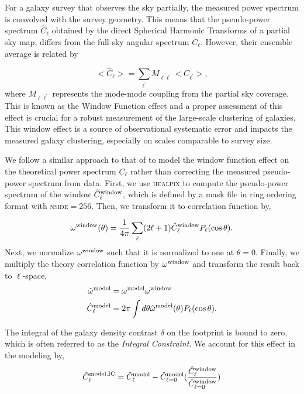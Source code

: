 For a galaxy survey that observes the sky partially, the measured power spectrum is convolved with the survey geometry. This means that the pseudo-power spectrum $\hat{C}_{\ell}$ obtained by the direct Spherical Harmonic Transforms of a partial sky map, differs from the full-sky angular spectrum $C_{\ell}$. However, their ensemble average is related by \citep{hivonmaster2002ApJ...567....2H} 

\begin{equation}
    <\hat{C}_{\ell}> = \sum_{\ell^{\prime}} M_{\ell \ell^{\prime}}<C_{\ell^{\prime}}>,
\end{equation}
where $M_{\ell \ell^{\prime}}$ represents the mode-mode coupling from the partial sky coverage. This is known as the Window Function effect and a proper assessment of this effect is crucial for a robust measurement of the large-scale clustering of galaxies. This window effect is a source of observational systematic error and impacts the measured galaxy clustering, especially on scales comparable to survey size.

We follow a similar approach to that of \citep{chon2004MNRAS.350..914C} to model the window function effect on the theoretical power spectrum $C_{\ell}$ rather than correcting the measured pseudo-power spectrum from data. First, we use \textsc{healpix} to compute the pseudo-power spectrum of the window $\hat{C}^{\rm window}_{\ell}$, which is defined by a mask file in ring ordering format with \textsc{nside}$=256$. Then, we transform it to correlation function by,

\begin{equation}
    \omega^{\rm window} (\theta) = \frac{1}{4\pi}\sum_{\ell} (2\ell+1) \hat{C}^{\rm window}_{\ell} P_{\ell}(\cos \theta).
\end{equation}
Next, we normalize $\omega^{\rm window}$ such that it is normalized to one at $\theta=0$. Finally, we multiply the theory correlation function by $\omega^{\rm window}$ and transform the result back to $\ell$-space,%
\begin{align}
    \hat{\omega}^{\rm model} &= \omega^{\rm model} \omega^{\rm window} \\
    \hat{C}^{\rm model}_{\ell} &= 2\pi \int d\theta \hat{\omega}^{\rm model}(\theta)P_{\ell}(\cos \theta).
\end{align}

The integral of the galaxy density contrast $\delta$ on the footprint is bound to zero, which is often referred to as the \textit{Integral Constraint}. We account for this effect in the modeling by,
\begin{equation}
     \hat{C}^{\rm model, IC}_{\ell} = \hat{C}^{\rm model}_{\ell} - \hat{C}^{\rm model}_{\ell=0} (\frac{\hat{C}^{\rm window}_{\ell}}{\hat{C}^{\rm window}_{\ell=0}})
\end{equation}

